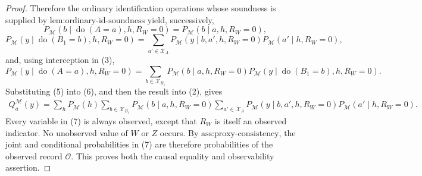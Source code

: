 \documentclass{article}
\begin{document}
\begin{proof}
Therefore the ordinary identification operations whose soundness is supplied by \(\text{lem:ordinary-id-soundness}\) yield, successively,
\[
P_{\mathcal M}(b\mid\operatorname{do}(A=a),h,R_W=0)
=P_{\mathcal M}(b\mid a,h,R_W=0),
\tag{4}
\]
\[
P_{\mathcal M}(y\mid\operatorname{do}(B_1=b),h,R_W=0)
=\sum_{a'\in\mathcal X_A}
P_{\mathcal M}(y\mid b,a',h,R_W=0)
P_{\mathcal M}(a'\mid h,R_W=0),
\tag{5}
\]
and, using interception in (3),
\[
P_{\mathcal M}(y\mid\operatorname{do}(A=a),h,R_W=0)
=\sum_{b\in\mathcal X_{B_1}}
P_{\mathcal M}(b\mid a,h,R_W=0)
P_{\mathcal M}(y\mid\operatorname{do}(B_1=b),h,R_W=0).
\tag{6}
\]
Substituting (5) into (6), and then the result into (2), gives
\[
\begin{aligned}
Q_a^{\mathcal M}(y)
=\sum_hP_{\mathcal M}(h)
\sum_{b\in\mathcal X_{B_1}}P_{\mathcal M}(b\mid a,h,R_W=0)
\sum_{a'\in\mathcal X_A}
P_{\mathcal M}(y\mid b,a',h,R_W=0)
P_{\mathcal M}(a'\mid h,R_W=0).
\end{aligned}
\tag{7}
\]
Every variable in (7) is always observed, except that \(R_W\) is itself an observed indicator.  No unobserved value of \(W\) or \(Z\) occurs.  By \(\text{ass:proxy-consistency}\), the joint and conditional probabilities in (7) are therefore probabilities of the observed record \(\mathcal O\).  This proves both the causal equality and observability assertion.
\end{proof}
\end{document}
